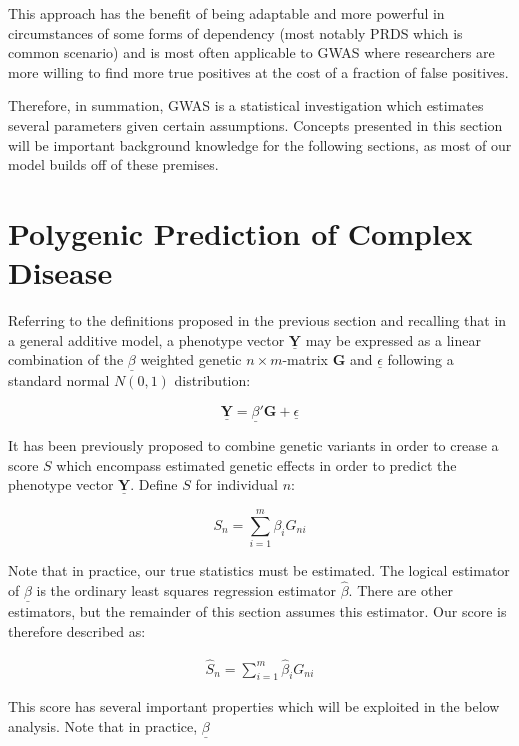 This approach has the benefit of being adaptable and more powerful in circumstances of some forms of dependency (most notably \ac{PRDS} which is common scenario) and is most often applicable to \ac{GWAS} where researchers are more willing to find more true positives at the cost of a fraction of false positives.

Therefore, in summation, \ac{GWAS} is a statistical investigation which estimates several parameters given certain assumptions. Concepts presented in this section will be important background knowledge for the following sections, as most of our model builds off of these premises. 

\section{Polygenic Prediction of Complex Disease}

Referring to the definitions proposed in the previous section and recalling that in a general additive model, a phenotype vector $\underline{\mathbf{Y}}$ may be expressed as a linear combination of the $\underline{\beta}$ weighted genetic $n \times m$-matrix $\mathbf{G}$ and $\underline{\epsilon}$ following a standard normal $N(0, 1)$ distribution: 

$$ \underline{\mathbf{Y}} = \underline{\beta}' \mathbf{G} + \underline{\epsilon} $$

It has been previously proposed to combine genetic variants in order to crease a score $S$ which encompass estimated genetic effects in order to predict the phenotype vector $\underline{\mathbf{Y}}$. Define $S$ for individual $n$:

$$ S_n = \sum^m_{i=1} \beta_i G_{ni} $$

Note that in practice, our true statistics must be estimated. The logical estimator of $\underline{\beta}$ is the ordinary least squares regression estimator $\hat{\beta}$. There are other estimators, but the remainder of this section assumes this estimator. Our score is therefore described as:

\begin{equation} 
\label{score}
\begin{aligned}
\hat{S}_n = \sum^m_{i=1} \hat{\beta}_i G_{ni} 
\end{aligned}
\end{equation}

This score has several important properties which will be exploited in the below analysis. Note that in practice, $\underline{\beta}$

